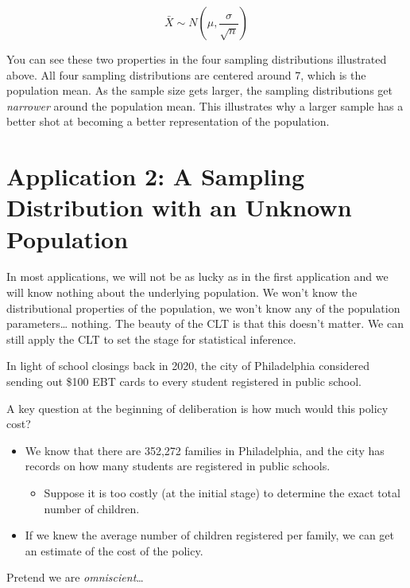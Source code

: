 \documentclass[
]{book}
\providecommand{\tightlist}{%
  \setlength{\itemsep}{0pt}\setlength{\parskip}{0pt}}
\begin{document}
\[ \bar{X} \sim N \left( \mu, \frac{\sigma}{\sqrt{n}} \right) \]

You can see these two properties in the four sampling distributions illustrated above. All four sampling distributions are centered around 7, which is the population mean. As the sample size gets larger, the sampling distributions get \emph{narrower} around the population mean. This illustrates why a larger sample has a better shot at becoming a better representation of the population.

\hypertarget{application-2-a-sampling-distribution-with-an-unknown-population}{%
\section{Application 2: A Sampling Distribution with an Unknown Population}\label{application-2-a-sampling-distribution-with-an-unknown-population}}

In most applications, we will not be as lucky as in the first application and we will know nothing about the underlying population. We won't know the distributional properties of the population, we won't know any of the population parameters\ldots{} nothing. The beauty of the CLT is that this doesn't matter. We can still apply the CLT to set the stage for statistical inference.

In light of school closings back in 2020, the city of Philadelphia considered sending out \$100 EBT cards to every student registered in public school.

A key question at the beginning of deliberation is how much would this policy cost?

\begin{itemize}
\item
  We know that there are 352,272 families in Philadelphia, and the city has records on how many students are registered in public schools.

  \begin{itemize}
  \tightlist
  \item
    Suppose it is too costly (at the initial stage) to determine the exact total number of children.
  \end{itemize}
\item
  If we knew the average number of children registered per family, we can get an estimate of the cost of the policy.
\end{itemize}

Pretend we are \emph{omniscient}\ldots{}
\end{document}
